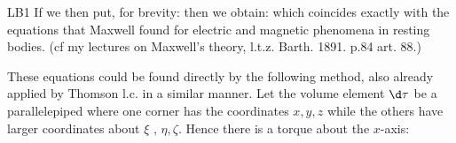 \begin{paper}{LB1}
If we then put, for brevity:
then we obtain:
which coincides exactly with the equations that Maxwell found for electric and magnetic phenomena in resting bodies. (cf my lectures on Maxwell's theory, l.t.z. Barth. 1891. p.84 art. 88.)

These equations could be found directly by the following method, also already applied by Thomson l.c. in a similar manner. Let the volume element $\d\tau$ be a parallelepiped where one corner has the coordinates $x,y,z$ while the others have larger coordinates about $\xi$ , $\eta,\zeta$. Hence there is a torque about the $x$-axis:


\end{paper}
